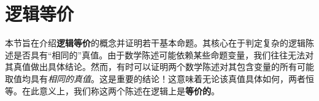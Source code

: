 \section{逻辑等价}

本节旨在介绍\textbf{逻辑等价}的概念并证明若干基本命题。其核心在于判定复杂的逻辑陈述是否具有``相同的''真值。由于数学陈述可能依赖某些命题变量，我们往往无法对其真值做出具体结论。然而，有时可以证明两个数学陈述对其包含变量的所有可能取值均具有\emph{相同的真值}。这是重要的结论！这意味着无论该真值具体如何，两者恒等。在此意义上，我们称这两个陈述在逻辑上是\textbf{等价的}。















